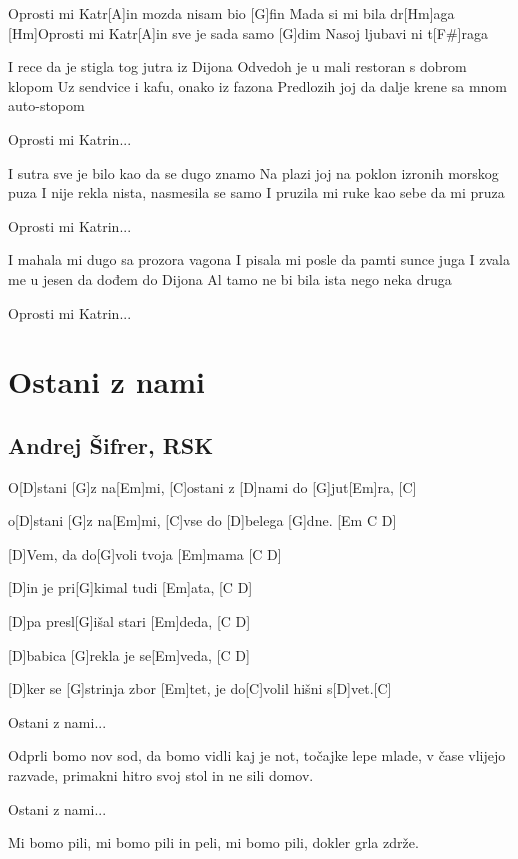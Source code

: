 \documentclass[a4paper,12pt]{article}
\begin{document}
\begin{multicols}{2}
\begin{guitar}
[Hm]Oprosti mi Katr[A]in mozda nisam bio [G]fin
Mada si mi bila dr[Hm]aga
[Hm]Oprosti mi Katr[A]in sve je sada samo [G]dim
Nasoj ljubavi ni t[F#]raga


I rece da je stigla tog jutra iz Dijona
Odvedoh je u mali restoran s dobrom klopom
Uz sendvice i kafu, onako iz fazona
Predlozih joj da dalje krene 
sa mnom auto-stopom


Oprosti mi Katrin...
   

I sutra sve je bilo kao da se dugo znamo
Na plazi joj na poklon izronih morskog puza
I nije rekla nista, nasmesila se samo
I pruzila mi ruke kao sebe da mi pruza

  
Oprosti mi Katrin...

   
I mahala mi dugo sa prozora vagona
I pisala mi posle da pamti sunce juga
I zvala me u jesen da dođem do Dijona
Al tamo ne bi bila ista nego neka druga

   
Oprosti mi Katrin...

\end{guitar}
\section{Ostani z nami}
\subsection*{Andrej Šifrer, RSK}
\begin{guitar}
[G Em C]        
  
O[D]stani [G]z na[Em]mi,  [C]ostani z [D]nami do [G]jut[Em]ra,  [C]

o[D]stani [G]z na[Em]mi,  [C]vse do [D]belega [G]dne. [Em C D]


[D]Vem, da do[G]voli tvoja [Em]mama [C D]

[D]in je pri[G]kimal tudi [Em]ata, [C D]

[D]pa presl[G]išal stari [Em]deda, [C D]

[D]babica [G]rekla je se[Em]veda, [C D]

[D]ker se [G]strinja zbor [Em]tet, je do[C]volil hišni s[D]vet.[C] 


Ostani z nami... 


Odprli bomo nov sod, 
da bomo vidli kaj je not, 
točajke lepe mlade, 
v čase vlijejo razvade, 
primakni hitro svoj stol  in ne sili domov. 


Ostani z nami... 


Mi bomo pili, mi bomo pili in peli, 
mi bomo pili, dokler grla zdrže. 
    

\end{guitar}
\end{multicols}
\end{document}
